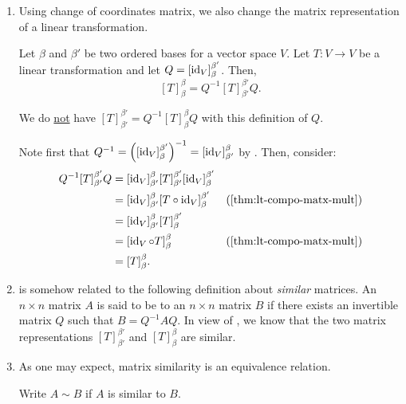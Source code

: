 \begin{enumerate}
\item Using change of coordinates matrix, we also change the matrix
representation of a linear transformation.

\begin{theorem}
\label{thm:change-lt-matx-rep}
Let \(\beta\) and \(\beta'\) be two ordered bases for a vector space \(V\). Let
\(T:V\to V\) be a linear transformation and let
\(Q=[\operatorname{id}_{V}]_{\beta}^{\beta'}\). Then,
\[
[T]_{\beta}^{\beta}=Q^{-1}[T]_{\beta'}^{\beta'}Q.
\]
\end{theorem}
\begin{warning}
We do \underline{not} have \([T]_{\beta'}^{\beta'}=Q^{-1}[T]_{\beta}^{\beta}Q\)
with this definition of \(Q\).
\end{warning}

\begin{pf}
Note first that
\(Q^{-1}=\qty([\operatorname{id}_{V}]_{\beta}^{\beta'})^{-1}=[\operatorname{id}_{V}]_{\beta'}^{\beta}\) by
. Then, consider:
\begin{align*}
Q^{-1}[T]_{\beta'}^{\beta'}Q
&=[\id_{V}]_{\beta'}^{\beta}[T]_{\beta'}^{\beta'}[\id_{V}]_{\beta}^{\beta'} \\
&=[\id_{V}]_{\beta'}^{\beta}[T\circ\id_{V}]_{\beta}^{\beta'}&\text{(\Cref{thm:lt-compo-matx-mult})} \\
&=[\id_{V}]_{\beta'}^{\beta}[T]_{\beta}^{\beta'} \\
&=[\id_{V}\circ T]_{\beta}^{\beta}&\text{(\Cref{thm:lt-compo-matx-mult})} \\
&=[T]_{\beta}^{\beta}.
\end{align*}
\end{pf}

\item {} is somehow related to the following
definition about \emph{similar} matrices. An \(n\times n\) matrix \(A\) is said
to be  to an \(n\times n\) matrix \(B\) if there exists an
invertible matrix \(Q\) such that \(B=Q^{-1}AQ\). In view of
, we know that the two
matrix representations \([T]_{\beta'}^{\beta'}\) and \([T]_{\beta}^{\beta}\)
are similar.

\item \label{it:matx-similar-equiv-relate}
As one may expect, matrix similarity is an equivalence relation.

\begin{pf}
Write \(A\sim B\) if \(A\) is similar to \(B\).


\end{pf}
\end{enumerate}

